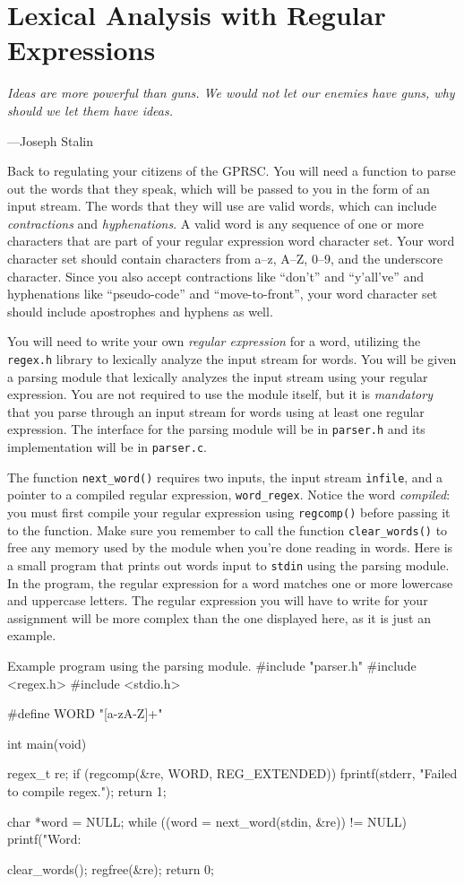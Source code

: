 \section{Lexical Analysis with Regular Expressions}

\textwidth
\epigraph{\emph{Ideas are more powerful than guns. We would not let our
enemies have guns, why should we let them have ideas.}}{---Joseph
Stalin}

\noindent
Back to regulating your citizens of the GPRSC. You will need a function
to parse out the words that they speak, which will be passed to you in
the form of an input stream. The words that they will use are valid
words, which can include \emph{contractions} and \emph{hyphenations}.
A valid word is any sequence of one or more characters that are part of
your regular expression word character set. Your word character set
should contain characters from a--z, A--Z, 0--9, and the underscore
character. Since you also accept contractions like ``don't'' and
``y'all've'' and hyphenations like ``pseudo-code'' and
``move-to-front'', your word character set should include apostrophes
and hyphens as well.

You will need to write your own \emph{regular expression} for a word,
utilizing the \texttt{regex.h} library to lexically analyze the input
stream for words. You will be given a parsing module that lexically
analyzes the input stream using your regular expression. You are not
required to use the module itself, but it is \emph{mandatory} that you
parse through an input stream for words using at least one regular
expression. The interface for the parsing module will be in
\texttt{parser.h} and its implementation will be in \texttt{parser.c}.

The function \texttt{next\_word()} requires two inputs, the input stream
\texttt{infile}, and a pointer to a compiled regular expression,
\texttt{word\_regex}. Notice the word \emph{compiled}: you must first compile
your regular expression using \texttt{regcomp()} before passing it to the
function. Make sure you remember to call the function \texttt{clear\_words()} to
free any memory used by the module when you're done reading in words.
Here is a small program that prints out words input to \texttt{stdin}
using the parsing module. In the program, the regular expression for a
word matches one or more lowercase and uppercase letters. The regular
expression you will have to write for your assignment will be more
complex than the one displayed here, as it is just an example.

\begin{clisting}{Example program using the parsing module.}
#include "parser.h"
#include <regex.h>
#include <stdio.h>

#define WORD "[a-zA-Z]+"

int main(void) {
    regex_t re;
    if (regcomp(&re, WORD, REG_EXTENDED)) {
        fprintf(stderr, "Failed to compile regex.\n");
        return 1;
    }

    char *word = NULL;
    while ((word = next_word(stdin, &re)) != NULL) {
        printf("Word: %
    }

    clear_words();
    regfree(&re);
    return 0;
}
\end{clisting}

